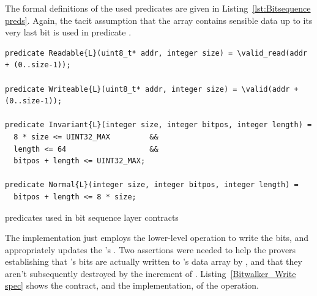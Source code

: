The formal definitions of the used \acsl predicates are given in
Listing~\ref{lst:Bitsequence preds}.
%
Again, the tacit assumption that the array contains sensible data
up to its very last bit is used in predicate .



\begin{listing}[hbt]
\begin{minipage}{0.99\textwidth}
\begin{lstlisting}[style=acsl-block]
predicate Readable{L}(uint8_t* addr, integer size) = \valid_read(addr + (0..size-1));

predicate Writeable{L}(uint8_t* addr, integer size) = \valid(addr + (0..size-1));

predicate Invariant{L}(integer size, integer bitpos, integer length) =
  8 * size <= UINT32_MAX         &&
  length <= 64                   &&
  bitpos + length <= UINT32_MAX;

predicate Normal{L}(integer size, integer bitpos, integer length) =
  bitpos + length <= 8 * size;
\end{lstlisting}
\end{minipage}
\caption{\label{lst:Bitsequence preds} \acsl predicates used in bit sequence layer contracts}
\end{listing}


\FloatBarrier


The implementation just employs the lower-level operation
 to
write the bits, and appropriately updates the 's
.
%
Two assertions were needed to help the provers establishing that
's
bits are actually written to 's data array by
, and that they aren't subsequently destroyed by
the increment of .
Listing~\ref{Bitwalker_Write spec} shows the contract, and the
implementation, of the
 operation.

